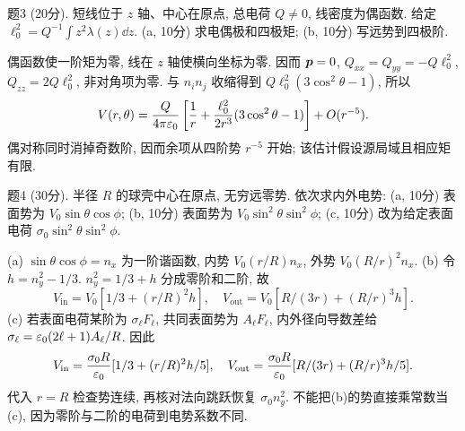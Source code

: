 \begin{exercise}
题3 (20分). 短线位于 $z$ 轴、中心在原点, 总电荷 $Q\ne0$, 线密度为偶函数. 给定 $\ell_0^2=Q^{-1}\int z^2\lambda(z)\dd z$. (a, 10分) 求电偶极和四极矩; (b, 10分) 写远势到四极阶.
\end{exercise}
\begin{solution}
偶函数使一阶矩为零, 线在 $z$ 轴使横向坐标为零. 因而 $\boldsymbol{p}=0$, $Q_{xx}=Q_{yy}=-Q\ell_0^2$, $Q_{zz}=2Q\ell_0^2$, 非对角项为零. 与 $n_in_j$ 收缩得到 $Q\ell_0^2(3\cos^2\theta-1)$, 所以
\[
V(r,\theta)=\frac Q{4\pi\varepsilon_0}\left[\frac1r+
\frac{\ell_0^2}{2r^3}(3\cos^2\theta-1)\right]+O(r^{-5}).
\]
偶对称同时消掉奇数阶, 因而余项从四阶势 $r^{-5}$ 开始; 该估计假设源局域且相应矩有限.
\end{solution}

\begin{exercise}
题4 (30分). 半径 $R$ 的球壳中心在原点, 无穷远零势. 依次求内外电势: (a, 10分) 表面势为 $V_0\sin\theta\cos\phi$; (b, 10分) 表面势为 $V_0\sin^2\theta\sin^2\phi$; (c, 10分) 改为给定表面电荷 $\sigma_0\sin^2\theta\sin^2\phi$.
\end{exercise}
\begin{solution}
(a) $\sin\theta\cos\phi=n_x$ 为一阶谐函数, 内势 $V_0(r/R)n_x$, 外势 $V_0(R/r)^2n_x$.
(b) 令 $h=n_y^2-1/3$. $n_y^2=1/3+h$ 分成零阶和二阶, 故
\[
V_\mathrm{in}=V_0[1/3+(r/R)^2h],\quad
V_\mathrm{out}=V_0[R/(3r)+(R/r)^3h].
\]
(c) 若表面电荷某阶为 $\sigma_\ell F_\ell$, 共同表面势为 $A_\ell F_\ell$, 内外径向导数差给
$\sigma_\ell=\varepsilon_0(2\ell+1)A_\ell/R$. 因此
\[
V_\mathrm{in}=\frac{\sigma_0R}{\varepsilon_0}[1/3+(r/R)^2h/5],\quad
V_\mathrm{out}=\frac{\sigma_0R}{\varepsilon_0}[R/(3r)+(R/r)^3h/5].
\]
代入 $r=R$ 检查势连续, 再核对法向跳跃恢复 $\sigma_0n_y^2$. 不能把(b)的势直接乘常数当(c), 因为零阶与二阶的电荷到电势系数不同.
\end{solution}
